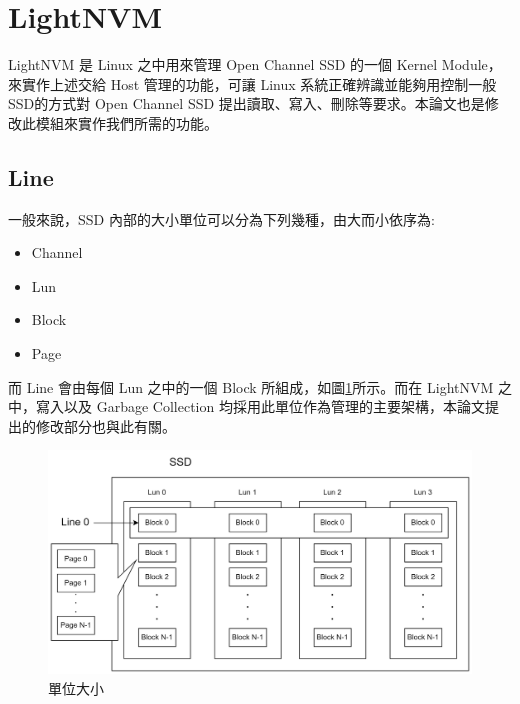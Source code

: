 \section{LightNVM}\label{s2.4}
\indent
LightNVM 是 Linux 之中用來管理 Open Channel SSD 的一個 Kernel Module，來實作上述交給 Host 管理的功能，可讓 Linux 系統正確辨識並能夠用控制一般SSD的方式對 Open Channel SSD 提出讀取、寫入、刪除等要求。本論文也是修改此模組來實作我們所需的功能。

\subsection{Line}\label{s2.4.1}
\indent
一般來說，SSD 內部的大小單位可以分為下列幾種，由大而小依序為:
\begin{itemize}
    \item Channel
    \item Lun
    \item Block
    \item Page
\end{itemize}
而 Line 會由每個 Lun 之中的一個 Block 所組成，如圖\ref{f2.9}所示。而在 LightNVM 之中，寫入以及 Garbage Collection 均採用此單位作為管理的主要架構，本論文提出的修改部分也與此有關。
\begin{figure}[H]
    \centering
    \includegraphics[width=1\textwidth]{picture/ch2/Line.png}
    \caption{單位大小}
    \label{f2.9}
\end{figure}